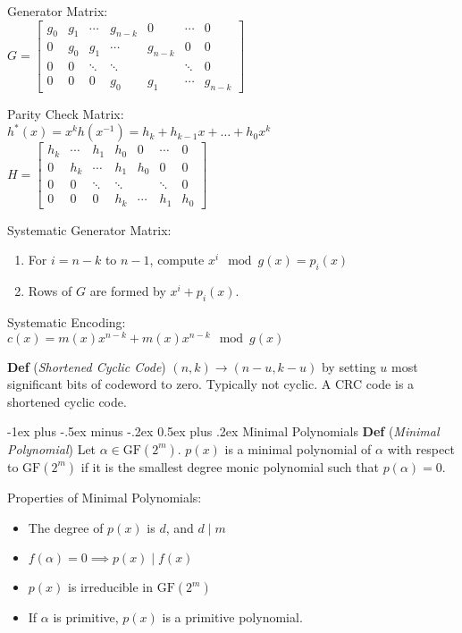 \documentclass[12pt,landscape]{article}
\makeatletter
\renewcommand{\section}{\@startsection{section}{1}{0mm}%
                                {-1ex plus -.5ex minus -.2ex}%
                                {0.5ex plus .2ex}%
                                {\normalfont\normalsize\bfseries}}
\newcommand{\tab}{\hspace{.02\textwidth}}
\newcommand{\defn}[1]{\textbf{Def} (\emph{#1})}
\newcommand{\gf}[1]{\text{GF}(#1)}
\makeatother
\begin{document}
\begin{multicols*}{3}
Generator Matrix:\\
\tab $G = \begin{bmatrix}
	g_0 & g_1 & \cdots & g_{n-k} & 0 & \cdots & 0\\
	0 & g_0 & g_1 & \cdots & g_{n-k} & 0 & 0\\
	0 & 0 & \ddots & \ddots & & \ddots & 0\\
	0 & 0 & 0 & g_0 & g_1 & \cdots & g_{n-k}
\end{bmatrix}$

Parity Check Matrix:\\
\tab $h^*(x) = x^kh(x^{-1}) = h_k + h_{k-1}x + \ldots + h_0x^k$\\
\tab $H = \begin{bmatrix}
	h_k & \cdots & h_1 & h_0 & 0 & \cdots & 0\\
	0 & h_k & \cdots & h_1 & h_0 & 0 & 0\\
	0 & 0 & \ddots & \ddots & & \ddots & 0\\
	0 & 0 & 0 & h_k & \cdots & h_1 & h_0
\end{bmatrix}$

\columnbreak
Systematic Generator Matrix:\\
\vspace{-0.5em}
\begin{enumerate}[itemsep=0em]
	\setlength\itemsep{0em}
	\item For $i = n-k$ to $n-1$, compute $x^i \mod g(x) = p_i(x)$
	\item Rows of $G$ are formed by $x^i + p_i(x)$.
\end{enumerate}

Systematic Encoding:\\
\tab $c(x) = m(x)x^{n-k} + m(x)x^{n-k}\mod g(x)$

\defn{Shortened Cyclic Code} $(n, k) \rightarrow (n-u, k-u)$ by setting $u$ most significant bits of codeword to zero. Typically not cyclic. A CRC code is a shortened cyclic code.

\section{Minimal Polynomials}
\defn{Minimal Polynomial} Let $\alpha \in \gf{2^m}$. $p(x)$ is a minimal polynomial of $\alpha$ with respect to $\gf{2^m}$ if it is the smallest degree monic polynomial such that $p(\alpha) = 0$.

Properties of Minimal Polynomials:\\
\vspace{-0.5em}
\begin{itemize}[itemsep=0em]
	\item The degree of $p(x)$ is $d$, and $d \mid m$
	\item $f(\alpha) = 0 \implies p(x) \mid f(x)$
	\item $p(x)$ is irreducible in $\gf{2^m}$
	\item If $\alpha$ is primitive, $p(x)$ is a primitive polynomial.
\end{itemize}


\end{multicols*}
\end{document}
